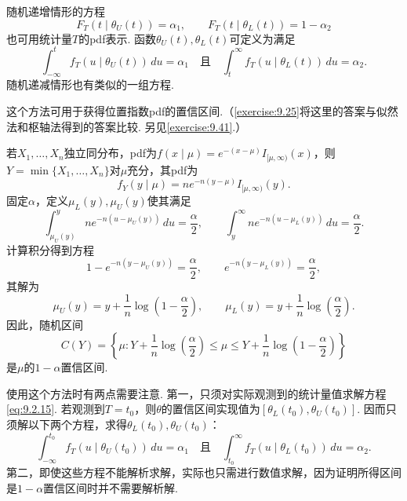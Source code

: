 随机递增情形的方程
\begin{equation}\label{eq:9.2.15}
F_T(t\mid\theta_U(t))=\alpha_1,\qquad F_T(t\mid\theta_L(t))=1-\alpha_2
\end{equation}
也可用统计量$T$的pdf表示. 函数$\theta_U(t),\theta_L(t)$可定义为满足
$$\int_{-\infty}^t f_T(u\mid\theta_U(t))\,du=\alpha_1\quad\text{且}\quad\int_t^\infty f_T(u\mid\theta_L(t))\,du=\alpha_2.$$
随机递减情形也有类似的一组方程.
\begin{example}[位置指数分布区间]\label{ex:9.2.13}
这个方法可用于获得位置指数pdf的置信区间.（\autoref{exercise:9.25}将这里的答案与似然法和枢轴法得到的答案比较. 另见\autoref{exercise:9.41}.）

若$X_1,\ldots,X_n$独立同分布，pdf为$f(x\mid\mu)=e^{-(x-\mu)}I_{[\mu,\infty)}(x)$，则$Y=\min\{X_1,\ldots,X_n\}$对$\mu$充分，其pdf为
$$f_Y(y\mid\mu)=ne^{-n(y-\mu)}I_{[\mu,\infty)}(y).$$
固定$\alpha$，定义$\mu_L(y),\mu_U(y)$使其满足
$$\int_{\mu_U(y)}^y ne^{-n(u-\mu_U(y))}\,du=\frac\alpha2,\qquad\int_y^\infty ne^{-n(u-\mu_L(y))}\,du=\frac\alpha2.$$
计算积分得到方程
$$1-e^{-n(y-\mu_U(y))}=\frac\alpha2,\qquad e^{-n(y-\mu_L(y))}=\frac\alpha2,$$
其解为
$$\mu_U(y)=y+\frac1n\log\left(1-\frac\alpha2\right),\qquad\mu_L(y)=y+\frac1n\log\left(\frac\alpha2\right).$$
因此，随机区间
$$C(Y)=\left\{\mu:Y+\frac1n\log\left(\frac\alpha2\right)\le\mu\le Y+\frac1n\log\left(1-\frac\alpha2\right)\right\}$$
是$\mu$的$1-\alpha$置信区间.
\end{example}
使用这个方法时有两点需要注意. 第一，只须对实际观测到的统计量值求解方程\eqref{eq:9.2.15}. 若观测到$T=t_0$，则$\theta$的置信区间实现值为$[\theta_L(t_0),\theta_U(t_0)]$. 因而只须解以下两个方程，求得$\theta_L(t_0),\theta_U(t_0)$：
$$\int_{-\infty}^{t_0}f_T(u\mid\theta_U(t_0))\,du=\alpha_1\quad\text{且}\quad\int_{t_0}^\infty f_T(u\mid\theta_L(t_0))\,du=\alpha_2.$$
第二，即使这些方程不能解析求解，实际也只需进行数值求解，因为证明所得区间是$1-\alpha$置信区间时并不需要解析解.

